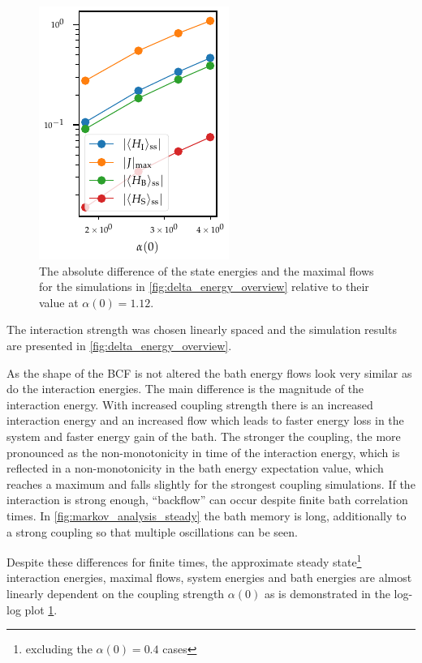 \begin{figure}
  \centering
  \includegraphics{figs/one_bath_syst/final_states_flows}
  \caption{\label{fig:delta_fs_flow} The absolute difference of the state energies and the
  maximal flows for the simulations in
  \cref{fig:delta_energy_overview} relative to their value at \(α(0)=1.12\).}
\end{figure}
The interaction strength was chosen linearly spaced and the simulation
results are presented in \cref{fig:delta_energy_overview}.

As the shape of the BCF is not altered the bath energy flows look very
similar as do the interaction energies. The main difference is the
magnitude of the interaction energy. With increased coupling strength
there is an increased interaction energy and an increased flow which
leads to faster energy loss in the system and faster energy gain of
the bath. The stronger the coupling, the more pronounced as the
non-monotonicity in time of the interaction energy, which is reflected
in a non-monotonicity in the bath energy expectation value, which
reaches a maximum and falls slightly for the strongest coupling
simulations. If the interaction is strong enough, ``backflow'' can
occur despite finite bath correlation times. In
\cref{fig:markov_analysis_steady} the bath memory is long,
additionally to a strong coupling so that multiple oscillations can be
seen.

Despite these differences for finite times, the approximate steady
state\footnote{excluding the \(α(0)=0.4\) cases} interaction energies,
maximal flows, system energies and bath energies are almost linearly
dependent on the coupling strength \(α(0)\) as is demonstrated in the
log-log plot \cref{fig:delta_fs_flow}.

